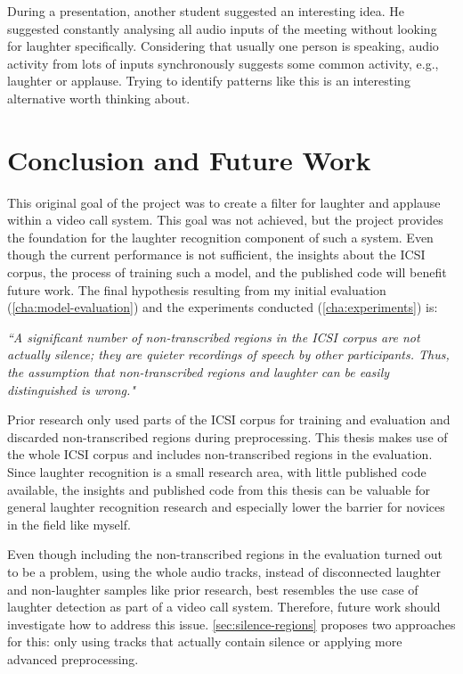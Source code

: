 \documentclass[bsc,frontabs,parskip,deptreport]{infthesis}
\begin{document}
During a presentation, another student suggested an interesting idea. He suggested constantly analysing all audio inputs of the meeting without looking for laughter specifically. Considering that usually one person is speaking, audio activity from lots of inputs synchronously suggests some common activity, e.g., laughter or applause. Trying to identify patterns like this is an interesting alternative worth thinking about. 

\chapter{Conclusion and Future Work}
This original goal of the project was to create a filter for laughter and applause within a video call system. This goal was not achieved, but the project provides the foundation for the laughter recognition component of such a system.
Even though the current performance is not sufficient, the insights about the ICSI corpus, the process of training such a model, and the published code \citep{Wolter_A_Machine_Learning_2022} will benefit future work.
The final hypothesis resulting from my initial evaluation (\autoref{cha:model-evaluation}) and the experiments conducted (\autoref{cha:experiments}) is:

\textit{``A significant number of non-transcribed regions in the ICSI corpus are not actually silence; they are quieter recordings of speech by other participants. Thus, the assumption that non-transcribed regions and laughter can be easily distinguished is wrong."}

Prior research \citep{kennedy2004laughter,knox2006automatic, truong2005automatic} only used parts of the ICSI corpus for training and evaluation and discarded non-transcribed regions during preprocessing.
This thesis makes use of the whole ICSI corpus and includes non-transcribed regions in the evaluation. 
Since laughter recognition is a small research area, with little published code available, the insights and published code \citep{Wolter_A_Machine_Learning_2022} from this thesis can be valuable for general laughter recognition research and especially lower the barrier for novices in the field like myself.

Even though including the non-transcribed regions in the evaluation turned out to be a problem, using the whole audio tracks, instead of disconnected laughter and non-laughter samples like prior research, best resembles the use case of laughter detection as part of a video call system. 
Therefore, future work should investigate how to address this issue.
\autoref{sec:silence-regions} proposes two approaches for this: only using tracks that actually contain silence or applying more advanced preprocessing. 
\end{document}
